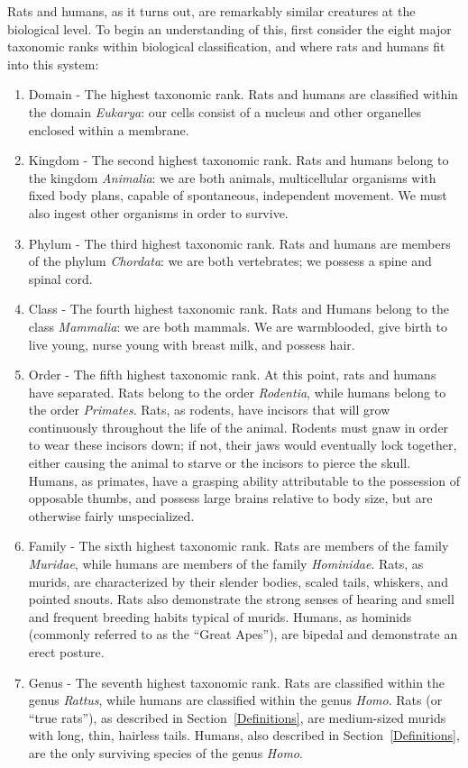 \documentclass[12pt]{article}
\begin{document}
Rats and humans, as it turns out, are remarkably similar creatures at the biological level. To begin an understanding of this, first consider the eight major taxonomic ranks within biological classification, and where rats and humans fit into this system:
\begin{enumerate}
\item Domain - The highest taxonomic rank. Rats and humans are classified within the domain \textit{Eukarya}: our cells consist of a nucleus and other organelles enclosed within a membrane.
\item Kingdom - The second highest taxonomic rank. Rats and humans belong to the kingdom \textit{Animalia}: we are both animals, multicellular organisms with fixed body plans, capable of spontaneous, independent movement. We must also ingest other organisms in order to survive.
\item Phylum - The third highest taxonomic rank. Rats and humans are members of the phylum \textit{Chordata}: we are both vertebrates; we possess a spine and spinal cord.
\item Class - The fourth highest taxonomic rank. Rats and Humans belong to the class \textit{Mammalia}: we are both mammals. We are warmblooded, give birth to live young, nurse young with breast milk, and possess hair.
\item Order - The fifth highest taxonomic rank. At this point, rats and humans have separated. Rats belong to the order \textit{Rodentia}, while humans belong to the order \textit{Primates}. Rats, as rodents, have incisors that will grow continuously throughout the life of the animal. Rodents must gnaw in order to wear these incisors down; if not, their jaws would eventually lock together, either causing the animal to starve or the incisors to pierce the skull. Humans, as primates, have a grasping ability attributable to the possession of opposable thumbs, and possess large brains relative to body size, but are otherwise fairly unspecialized.
\item Family - The sixth highest taxonomic rank. Rats are members of the family \textit{Muridae}, while humans are members of the family \textit{Hominidae}. Rats, as murids, are characterized by their slender bodies, scaled tails, whiskers, and pointed snouts. Rats also demonstrate the strong senses of hearing and smell and frequent breeding habits typical of murids. Humans, as hominids (commonly referred to as the ``Great Apes''), are bipedal and demonstrate an erect posture.
\item Genus - The seventh highest taxonomic rank. Rats are classified within the genus \textit{Rattus}, while humans are classified within the genus \textit{Homo}. Rats (or ``true rats''), as described in Section~\ref{Definitions}, are medium-sized murids with long, thin, hairless tails. Humans, also described in Section~\ref{Definitions}, are the only surviving species of the genus \textit{Homo}.

\end{enumerate}
\end{document}
